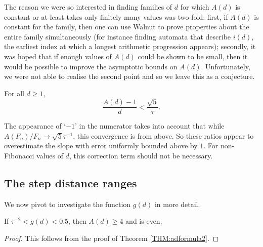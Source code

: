 \documentclass[10pt,a4paper,reqno]{amsart}
\newcommand{\walnut}{{\ttfamily Walnut}}
\begin{document}
The reason we were so interested in finding families of $d$ for which $A(d)$ is constant or at least takes only finitely many values was two-fold: first, if $A(d)$ is constant for the family, then one can use {\walnut} to prove properties about the entire family simultaneously (for instance finding automata that describe $i(d)$, the earliest index at which a longest arithmetic progression appears); secondly, it was hoped that if enough values of $A(d)$ could be shown to be small, then it would be possible to improve the asymptotic bounds on $A(d)$. Unfortunately, we were not able to realise the second point and so we leave this as a conjecture.
\begin{conj}\label{CONJ:fibmaxslope}
For all $d \geq 1$,
\[
\frac{A(d)-1}{d} < \frac{\sqrt{5}}{\tau}.
\]
\end{conj}
The appearance of `$-1$' in the numerator takes into account that while $A(F_n)/F_n \to \sqrt{5}\tau^{-1}$, this convergence is from above. So these ratios appear to overestimate the slope with error uniformly bounded above by $1$. For non-Fibonacci values of $d$, this correction term should not be necessary.

\subsection{The step distance ranges}
We now pivot to investigate the function $g(d)$ in more detail.
\begin{cor}\label{COR:ad4andeven}
If $\tau^{-2}< g(d)<0.5$, then $A(d)\geq4$ and is even.
\end{cor}
\begin{proof}
This follows from the proof of Theorem \ref{THM:adformula2}.
\end{proof}
\end{document}
